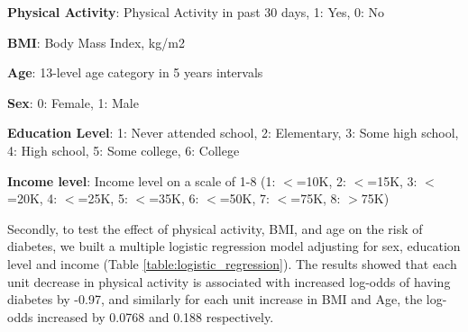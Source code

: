 \documentclass[11pt]{article}
\begin{document}
\begin{table}[h]
\caption{Mean values of physical activity, BMI, age, and potential confounders stratified by diabetes status}
\label{table:descriptive_stats}
\begin{threeparttable}
\renewcommand{\TPTminimum}{\linewidth}
\begin{tablenotes}
\footnotesize
\item \textbf{Physical Activity}: Physical Activity in past 30 days, 1: Yes, 0: No
\item \textbf{BMI}: Body Mass Index, kg/m2
\item \textbf{Age}: 13-level age category in 5 years intervals
\item \textbf{Sex}: 0: Female, 1: Male
\item \textbf{Education Level}: 1: Never attended school, 2: Elementary, 3: Some high school, 4: High school, 5: Some college, 6: College
\item \textbf{Income level}: Income level on a scale of 1-8 (1: $<$=10K, 2: $<$=15K, 3: $<$=20K, 4: $<$=25K, 5: $<$=35K, 6: $<$=50K, 7: $<$=75K, 8: $>$75K)
\end{tablenotes}
\end{threeparttable}
\end{table}


Secondly, to test the effect of physical activity, BMI, and age on the risk of diabetes, we built a multiple logistic regression model adjusting for sex, education level and income (Table \ref{table:logistic_regression}). The results showed that each unit decrease in physical activity is associated with increased log-odds of having diabetes by -0.97, and similarly for each unit increase in BMI and Age, the log-odds increased by 0.0768 and 0.188 respectively.
\end{document}
